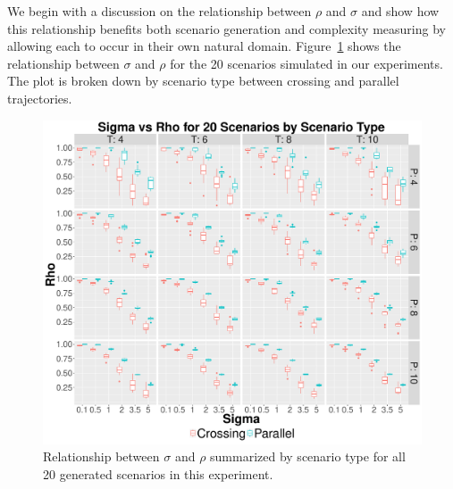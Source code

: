 We begin with a discussion on the relationship between $\rho$ and $\sigma$ and show how this relationship benefits both scenario generation and complexity measuring by allowing each to occur in their own natural domain. Figure~\ref{fig:Sigma_vs_Rho} shows the relationship between $\sigma$ and $\rho$ for the 20 scenarios simulated in our experiments. The plot is broken down by scenario type between crossing and parallel trajectories. 
\begin{figure}[ht]
  \centering
  \includegraphics[width=\columnwidth]{../Figures//Sigma_vs_Rho}
    \caption{Relationship between $\sigma$ and $\rho$ summarized by scenario type for all 20 generated scenarios in this experiment.}
    \label{fig:Sigma_vs_Rho}
\end{figure}

